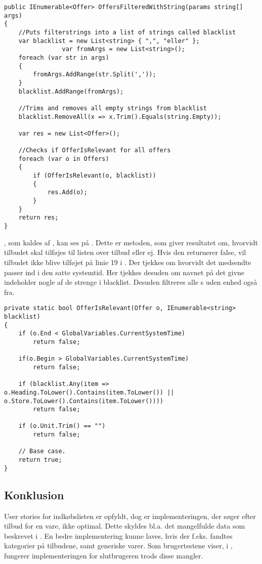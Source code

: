 \begin{lstlisting}[caption={\class{OffersFilteredByUserPref} er metoden, der filtrerer \class{Offers} på baggrund af uønskede strenge.}, label=OffersFilteredByUserPrefs] 
public IEnumerable<Offer> OffersFilteredWithString(params string[] args)
{
	//Puts filterstrings into a list of strings called blacklist
    var blacklist = new List<string> { ",", "eller" };
                var fromArgs = new List<string>();
    foreach (var str in args)
    {
        fromArgs.AddRange(str.Split(','));
    }
    blacklist.AddRange(fromArgs);
    
    //Trims and removes all empty strings from blacklist
    blacklist.RemoveAll(x => x.Trim().Equals(string.Empty));

    var res = new List<Offer>();

	//Checks if OfferIsRelevant for all offers
    foreach (var o in Offers)
    {
        if (OfferIsRelevant(o, blacklist))
        {
            res.Add(o);
        }
    }
    return res;
}
\end{lstlisting}

, som kaldes af , kan ses på . 
Dette er metoden, som giver resultatet om, hvorvidt tilbudet skal tilføjes til listen over tilbud eller ej. 
Hvis den returnerer false, vil tilbudet ikke blive tilføjet på linie 19 i .
Der tjekkes om hvorvidt det medsendte  passer ind i den satte systemtid.
Her tjekkes desuden om navnet på det givne  indeholder nogle af de strenge i blacklist.
Desuden filtreres alle s uden enhed også fra.

\begin{lstlisting}[caption={\class{OffersFilteredByUserPrefs}, sørger for at tilbudet som modtages som input overholder de forskellige krav sat i blacklisten.}, label=OfferIsRelevant]
private static bool OfferIsRelevant(Offer o, IEnumerable<string> blacklist)
{
    if (o.End < GlobalVariables.CurrentSystemTime)
        return false;

    if(o.Begin > GlobalVariables.CurrentSystemTime)
        return false;

    if (blacklist.Any(item => o.Heading.ToLower().Contains(item.ToLower()) || o.Store.ToLower().Contains(item.ToLower())))
        return false;

    if (o.Unit.Trim() == "")
        return false;

    // Base case.
    return true;
}
\end{lstlisting}

\subsection{Konklusion}
User stories for indkøbslisten er opfyldt, dog er implementeringen, der søger efter tilbud for en vare, ikke optimal.
Dette skyldes bl.a. det mangelfulde data som beskrevet i .
En bedre implementering kunne laves, hvis der f.eks. fandtes kategorier på tilbudene, samt generiske varer.
Som brugertestene viser, i , fungerer implementeringen for slutbrugeren trods disse mangler.
